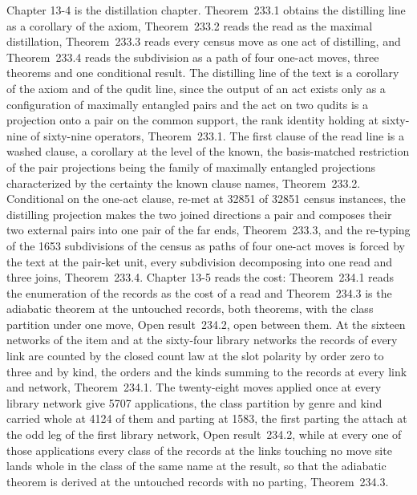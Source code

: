 Chapter 13-4 is the distillation chapter. Theorem~233.1 obtains the distilling line as a corollary of the axiom, Theorem~233.2 reads the read as the maximal distillation, Theorem~233.3 reads every census move as one act of distilling, and Theorem~233.4 reads the subdivision as a path of four one-act moves, three theorems and one conditional result. The distilling line of the text is a corollary of the axiom and of the qudit line, since the output of an act exists only as a configuration of maximally entangled pairs and the act on two qudits is a projection onto a pair on the common support, the rank identity holding at sixty-nine of sixty-nine operators, Theorem~233.1. The first clause of the read line is a washed clause, a corollary at the level of the known, the basis-matched restriction of the pair projections being the family of maximally entangled projections characterized by the certainty the known clause names, Theorem~233.2. Conditional on the one-act clause, re-met at 32851 of 32851 census instances, the distilling projection makes the two joined directions a pair and composes their two external pairs into one pair of the far ends, Theorem~233.3, and the re-typing of the 1653 subdivisions of the census as paths of four one-act moves is forced by the text at the pair-ket unit, every subdivision decomposing into one read and three joins, Theorem~233.4. Chapter 13-5 reads the cost: Theorem~234.1 reads the enumeration of the records as the cost of a read and Theorem~234.3 is the adiabatic theorem at the untouched records, both theorems, with the class partition under one move, Open result~234.2, open between them. At the sixteen networks of the item and at the sixty-four library networks the records of every link are counted by the closed count law at the slot polarity by order zero to three and by kind, the orders and the kinds summing to the records at every link and network, Theorem~234.1. The twenty-eight moves applied once at every library network give 5707 applications, the class partition by genre and kind carried whole at 4124 of them and parting at 1583, the first parting the attach at the odd leg of the first library network, Open result~234.2, while at every one of those applications every class of the records at the links touching no move site lands whole in the class of the same name at the result, so that the adiabatic theorem is derived at the untouched records with no parting, Theorem~234.3.

